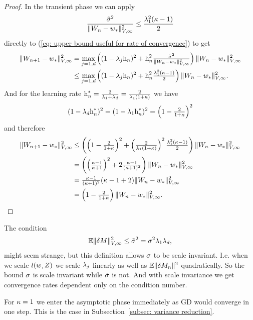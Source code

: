 \begin{proof}
	In the transient phase we can apply
	\begin{align*}
		\frac{\tilde{\sigma}^2}{
			\|W_n-w_*\|_{V,\infty}^2
		}
		\le \frac{\lambda_1^2(\kappa-1)}{2}
	\end{align*}
	directly to (\ref{eq: upper bound useful for rate of convergence}) to get
	\begin{align*}
		\|W_{n+1}-w_*\|_{V,\infty}^2
		&= \max_{j=1,d}\left((1- \lambda_j\text{h}_n)^2
			+\text{h}_n^2\tfrac{\tilde{\sigma}^2}{\|W_n-w_*\|_{V,\infty}^2}
		\right)\|W_n-w_*\|_{V,\infty}^2\\
		&\le \max_{j=1,d}\left((1- \lambda_j\text{h}_n)^2
			+\text{h}_n^2\tfrac{\lambda_1^2(\kappa-1)}{2}
		\right)\|W_n-w_*\|_{V,\infty}^2.
	\end{align*}
	And for the learning rate \(\text{h}_n^*=\tfrac{2}{\lambda_1+\lambda_d}=\tfrac{2}{\lambda_1(1+\kappa)}\)
	we have
	\begin{align*}
		(1-\lambda_d\text{h}_n^*)^2
		= (1-\lambda_1\text{h}_n^*)^2
		= \left(1-\tfrac{2}{1+\kappa}\right)^2
	\end{align*}
	and therefore
	\begin{align*}
		\|W_{n+1}-w_*\|_{V,\infty}^2
		&\le \left(\left(1-\tfrac{2}{1+\kappa}\right)^2
			+\left(\tfrac{2}{\lambda_1(1+\kappa)}\right)^2\tfrac{\lambda_1^2(\kappa-1)}{2}
		\right)\|W_n-w_*\|_{V,\infty}^2\\
		&=\left(
			\left(\tfrac{\kappa-1}{\kappa+1}\right)^2 + 2 \tfrac{\kappa-1}{(\kappa+1)^2}
		\right)\|W_n-w_*\|_{V,\infty}^2\\
		&= \tfrac{\kappa-1}{(\kappa+1)^2}(\kappa-1 + 2)\|W_n-w_*\|_{V,\infty}^2\\
		&= \left(1-\tfrac{2}{1+\kappa}\right)\|W_n - w_*\|_{V,\infty}^2.
		\qedhere
	\end{align*}
\end{proof}
\begin{remark}
	The condition
	\begin{align*}
		\mathbb{E}\|\delta M\|_{V,\infty}^2
		\le \tilde{\sigma}^2 = \sigma^2 \lambda_1\lambda_d,
	\end{align*}
	might seem strange, but this definition allows \(\sigma\) to be scale
	invariant. I.e. when we scale \(l(w, Z)\) we scale \(\lambda_j\)
	linearly as well as \(\mathbb{E}\|\delta M_n\|^2\) quadratically. So the
	bound \(\sigma\) is scale invariant while \(\tilde{\sigma}\) is not.
	And with scale invariance we get convergence rates dependent only on the
	condition number.
\end{remark}
\begin{remark}
	For \(\kappa=1\) we enter the asymptotic phase immediately as GD would
	converge in one step. This is the case in Subsection~\ref{subsec:
	variance reduction}.
\end{remark}

